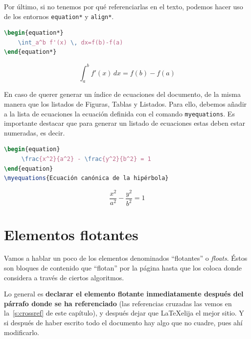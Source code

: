 \documentclass[%
    school=etsisi,%
    type=pfg,%
    degree=61CI,%
]{upm-report}
\begin{document}
Por último, si no tenemos por qué referenciarlas en el texto, podemos hacer uso de los entornos \texttt{equation*} y \texttt{align*}.

\begin{minipage}[c]{.5\textwidth}
\begin{lstlisting}[language=tex]
\begin{equation*}
    \int_a^b f'(x) \, dx=f(b)-f(a)
\end{equation*}
\end{lstlisting}
\end{minipage}%
\begin{minipage}[c]{.5\textwidth}
\begin{equation*}
    \int_a^b f'(x) \, dx=f(b)-f(a)
\end{equation*}
\end{minipage}

En caso de querer generar un índice de ecuaciones del documento, de la misma manera que los listados de Figuras, Tablas y Listados. Para ello, debemos añadir a la lista de ecuaciones la ecuación definida con el comando \texttt{myequations}. Es importante destacar que para generar un listado de ecuaciones estas deben estar numeradas, es decir.

\begin{minipage}[c]{.5\textwidth}
\begin{lstlisting}[language=tex]
\begin{equation}
     \frac{x^2}{a^2} - \frac{y^2}{b^2} = 1
\end{equation}
\myequations{Ecuación canónica de la hipérbola}
\end{lstlisting}
\end{minipage}%
\begin{minipage}[c]{.5\textwidth}
\begin{equation}
     \frac{x^2}{a^2} - \frac{y^2}{b^2} = 1
\end{equation}
\end{minipage} 

\section{Elementos flotantes}

Vamos a hablar un poco de los elementos denominados \enquote{flotantes} o \textit{floats}. Éstos son bloques de contenido que \enquote{flotan} por la página hasta que  los coloca donde considera a través de ciertos algoritmos.

Lo general es \textbf{declarar el elemento flotante inmediatamente después del párrafo donde se ha referenciado} (las referencias cruzadas las vemos en la~\autoref{s:crossref} de este capítulo), y después dejar que \LaTeX\space elija el mejor sitio. Y si después de haber escrito todo el documento hay algo que no cuadre, pues ahí modificarlo.
\end{document}
